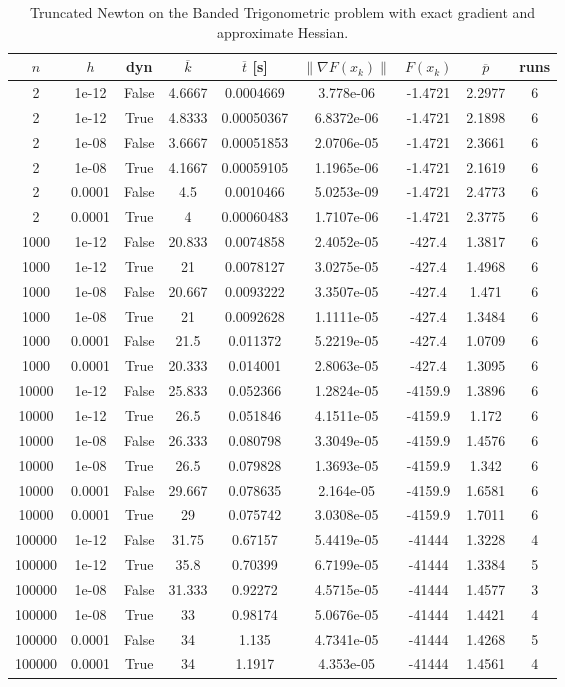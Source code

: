 \begin{table}
\caption{Truncated Newton on the Banded Trigonometric problem with exact gradient and approximate Hessian.}
\label{tab:tn_trig_ex_grad}
\begin{tabular}{ccccccccc}
\toprule
$n$ & $h$ & dyn & $\overline{k}$ & $\overline{t}$ [s] & $\|\nabla F(x_k)\|$ & $F(x_k)$ & $\overline{p}$ & runs \\
\midrule
2 & 1e-12 & False & 4.6667 & 0.0004669 & 3.778e-06 & -1.4721 & 2.2977 & 6 \\
2 & 1e-12 & True & 4.8333 & 0.00050367 & 6.8372e-06 & -1.4721 & 2.1898 & 6 \\
2 & 1e-08 & False & 3.6667 & 0.00051853 & 2.0706e-05 & -1.4721 & 2.3661 & 6 \\
2 & 1e-08 & True & 4.1667 & 0.00059105 & 1.1965e-06 & -1.4721 & 2.1619 & 6 \\
2 & 0.0001 & False & 4.5 & 0.0010466 & 5.0253e-09 & -1.4721 & 2.4773 & 6 \\
2 & 0.0001 & True & 4 & 0.00060483 & 1.7107e-06 & -1.4721 & 2.3775 & 6 \\
1000 & 1e-12 & False & 20.833 & 0.0074858 & 2.4052e-05 & -427.4 & 1.3817 & 6 \\
1000 & 1e-12 & True & 21 & 0.0078127 & 3.0275e-05 & -427.4 & 1.4968 & 6 \\
1000 & 1e-08 & False & 20.667 & 0.0093222 & 3.3507e-05 & -427.4 & 1.471 & 6 \\
1000 & 1e-08 & True & 21 & 0.0092628 & 1.1111e-05 & -427.4 & 1.3484 & 6 \\
1000 & 0.0001 & False & 21.5 & 0.011372 & 5.2219e-05 & -427.4 & 1.0709 & 6 \\
1000 & 0.0001 & True & 20.333 & 0.014001 & 2.8063e-05 & -427.4 & 1.3095 & 6 \\
10000 & 1e-12 & False & 25.833 & 0.052366 & 1.2824e-05 & -4159.9 & 1.3896 & 6 \\
10000 & 1e-12 & True & 26.5 & 0.051846 & 4.1511e-05 & -4159.9 & 1.172 & 6 \\
10000 & 1e-08 & False & 26.333 & 0.080798 & 3.3049e-05 & -4159.9 & 1.4576 & 6 \\
10000 & 1e-08 & True & 26.5 & 0.079828 & 1.3693e-05 & -4159.9 & 1.342 & 6 \\
10000 & 0.0001 & False & 29.667 & 0.078635 & 2.164e-05 & -4159.9 & 1.6581 & 6 \\
10000 & 0.0001 & True & 29 & 0.075742 & 3.0308e-05 & -4159.9 & 1.7011 & 6 \\
100000 & 1e-12 & False & 31.75 & 0.67157 & 5.4419e-05 & -41444 & 1.3228 & 4 \\
100000 & 1e-12 & True & 35.8 & 0.70399 & 6.7199e-05 & -41444 & 1.3384 & 5 \\
100000 & 1e-08 & False & 31.333 & 0.92272 & 4.5715e-05 & -41444 & 1.4577 & 3 \\
100000 & 1e-08 & True & 33 & 0.98174 & 5.0676e-05 & -41444 & 1.4421 & 4 \\
100000 & 0.0001 & False & 34 & 1.135 & 4.7341e-05 & -41444 & 1.4268 & 5 \\
100000 & 0.0001 & True & 34 & 1.1917 & 4.353e-05 & -41444 & 1.4561 & 4 \\
\bottomrule
\end{tabular}
\end{table}
